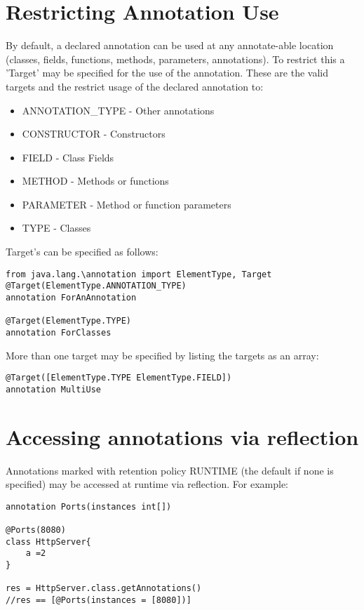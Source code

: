 \documentclass[conc-doc]{subfiles}
\begin{document}
\section{Restricting Annotation Use}
By default, a declared annotation can be used at any annotate-able location (classes, fields, functions, methods, parameters, annotations). To restrict this a 'Target' may be specified for the use of the annotation. These are the valid targets and the restrict usage of the declared annotation to:

\begin{itemize}
	\item ANNOTATION\_TYPE - Other annotations
	\item CONSTRUCTOR - Constructors
	\item FIELD - Class Fields
	\item METHOD - Methods or functions 
	\item PARAMETER - Method or function parameters
	\item TYPE - Classes
\end{itemize}

Target's can be specified as follows:

\begin{lstlisting}
from java.lang.\annotation import ElementType, Target
@Target(ElementType.ANNOTATION_TYPE)
annotation ForAnAnnotation

@Target(ElementType.TYPE)
annotation ForClasses
\end{lstlisting}

More than one target may be specified by listing the targets as an array:

\begin{lstlisting}
@Target([ElementType.TYPE ElementType.FIELD])
annotation MultiUse
\end{lstlisting}

\section{Accessing annotations via reflection}
Annotations marked with retention policy RUNTIME (the default if none is specified) may be accessed at runtime via reflection. For example:

\begin{lstlisting}
annotation Ports(instances int[])

@Ports(8080)
class HttpServer{
	a =2
}

res = HttpServer.class.getAnnotations()
//res == [@Ports(instances = [8080])]
\end{lstlisting}
\end{document}
